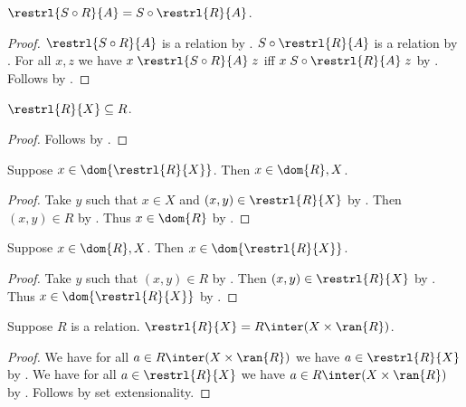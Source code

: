 \begin{proposition}\label{restrl_circ}
    $\restrl{S\circ R}{A}=S\circ\restrl{R}{A}$.
\end{proposition}
\begin{proof}
    $\restrl{S\circ R}{A}$ is a relation
        by .
    $S\circ\restrl{R}{A}$ is a relation by .
    For all $x,z$ we have
        $x\mathrel{\restrl{S\circ R}{A}}z$
        iff $x\mathrel{S\circ\restrl{R}{A}}z$
        by .
    Follows by .
\end{proof}

\begin{proposition}\label{restrl_subseteq}
    $\restrl{R}{X}\subseteq R$.
\end{proposition}
\begin{proof}
    Follows by .
\end{proof}

\begin{proposition}%
\label{elem_dom_of_restrl_implies_elem_dom_and_restr}
    Suppose $x\in \dom{\restrl{R}{X}}$.
    Then $x\in \dom{R}, X$.
\end{proposition}
\begin{proof}
    Take $y$ such that $x\in X$ and $(x, y)\in \restrl{R}{X}$
        by .
    Then $(x, y)\in R$ by .
    Thus $x\in\dom{R}$ by .
\end{proof}

\begin{proposition}%
\label{elem_dom_and_restr_implies_elem_of_restr}
    Suppose $x\in \dom{R}, X$.
    Then $x\in \dom{\restrl{R}{X}}$.
\end{proposition}
\begin{proof}
    Take $y$ such that $(x, y)\in R$ by .
    Then $(x, y)\in \restrl{R}{X}$ by .
    Thus $x\in\dom{\restrl{R}{X}}$ by .
\end{proof}

\begin{proposition}\label{restrl_eq_inter}
    Suppose $R$ is a relation.
    $\restrl{R}{X} = R\inter (X\times \ran{R})$.
\end{proposition}
\begin{proof}
    We have for all $a\in R\inter (X\times \ran{R})$
        we have $a\in \restrl{R}{X}$
        by .
    We have for all $a\in\restrl{R}{X}$
        we have $a\in R\inter (X\times \ran{R})$
        by .
    Follows by set extensionality.
\end{proof}

